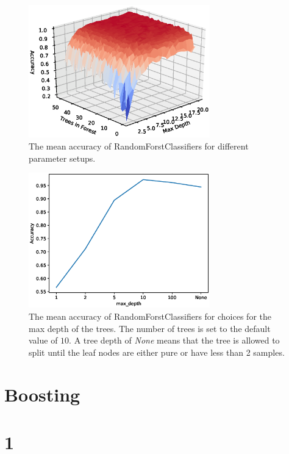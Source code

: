 \documentclass[11pt]{article}
\begin{document}
\begin{figure}[H]
\centering
\includegraphics[width=0.7\textwidth]{images/mnist_results.eps}
\caption{The mean accuracy of RandomForstClassifiers for different parameter setups.}
\label{fig:mnist_results}
\end{figure}

\begin{figure}[H]
\centering
\includegraphics[width=0.7\textwidth]{images/mnist_lines.eps}
\caption{The mean accuracy of RandomForstClassifiers for choices for the max depth of the trees. The number of trees is set to the default value of $10$. A tree depth of \textit{None} means that the tree is allowed to split until the leaf nodes are either pure or have less than 2 samples.}
\label{fig:mnist_lines}
\end{figure}

\section*{Boosting}

\section*{1}
\end{document}
